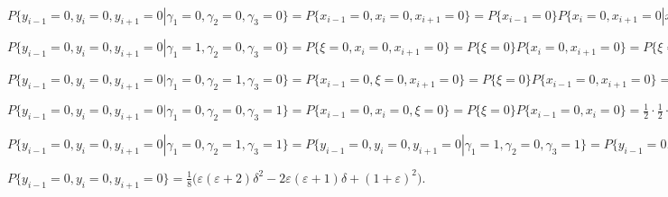\documentclass[a4paper,12pt]{article}
\theoremstyle{plain}
\begin{document}
	
	
		$P\{y_{i-1} = 0, y_i = 0, y_{i+1} = 0|\gamma_1=0,\gamma_2=0,\gamma_3=0\} = P\{x_{i-1} = 0, x_i = 0, x_{i+1} = 0\} = P\{x_{i-1} = 0\}P\{x_i=0, x_{i+1}=0 | x_{i-1} = 0\} = P\{x_{i-1} = 0\}P\{x_i=0\}P\{ x_{i+1}=0 | x_{i} = 0\}  = \frac{1}{2}\cdot\frac{1}{2}(1+\varepsilon)\cdot\frac{1}{2}(1+\varepsilon)=\frac{1}{8}(1+\varepsilon)^2;$\newline
		
		$P\{y_{i-1} = 0, y_i = 0, y_{i+1} = 0|\gamma_1=1,\gamma_2=0,\gamma_3=0\} = P\{\xi = 0, x_i = 0, x_{i+1} = 0\} = P\{\xi = 0\}P\{x_i=0, x_{i+1}=0 \} = P\{\xi = 0\}P\{x_i=0\}P\{ x_{i+1}=0 | x_{i} = 0\}  = \frac{1}{2}\cdot\frac{1}{2}(1+\varepsilon)\cdot\frac{1}{2}=\frac{1}{8}(1+\varepsilon);$\newline 
		
		$P\{y_{i-1} = 0, y_i = 0, y_{i+1} = 0|\gamma_1=0,\gamma_2=1,\gamma_3=0\} = P\{x_{i-1} = 0, \xi = 0, x_{i+1} = 0\} = P\{\xi = 0\}P\{x_{i-1}=0, x_{i+1}=0 \}  = \frac{1}{2}\cdot\frac{1}{2}\cdot\frac{1}{2}(1+\varepsilon^2)=\frac{1}{8}(1+\varepsilon^2);$\newline
		
		
		$P\{y_{i-1} = 0, y_i = 0, y_{i+1} = 0|\gamma_1=0,\gamma_2=0,\gamma_3=1\} = P\{x_{i-1} = 0, x_i = 0, \xi = 0\} = P\{\xi = 0\}P\{x_{i-1}=0, x_{i}=0 \}  = \frac{1}{2}\cdot\frac{1}{2}\cdot\frac{1}{2}(1+\varepsilon)=\frac{1}{8}(1+\varepsilon);$\newline
		
		$P\{y_{i-1} = 0, y_i = 0, y_{i+1} = 0|\gamma_1=0,\gamma_2=1,\gamma_3=1\} = P\{y_{i-1} = 0, y_i = 0, y_{i+1} = 0|\gamma_1=1,\gamma_2=0,\gamma_3=1\} =
		P\{y_{i-1} = 0, y_i = 0, y_{i+1} = 0|\gamma_1=1,\gamma_2=1,\gamma_3=0\} =
		P\{y_{i-1} = 0, y_i = 0, y_{i+1} = 0|\gamma_1=1,\gamma_2=1,\gamma_3=1\} = P\{\xi = 0, \xi = 0, \xi = 0\} = P\{\xi = 1\}P\{x_{i-1}=1\}P\{x_{i}=0 \}  = \frac{1}{2}\cdot\frac{1}{2}\cdot\frac{1}{2} = \frac{1}{8};$\newline
		
	$P\{y_{i-1} = 0, y_i = 0, y_{i+1} = 0\} =  \frac{1}{8}\bigr(\varepsilon(\varepsilon+2)\delta^2 - 2\varepsilon(\varepsilon+1)\delta + (1+\varepsilon)^2 \bigr).$\newline
\end{document}
